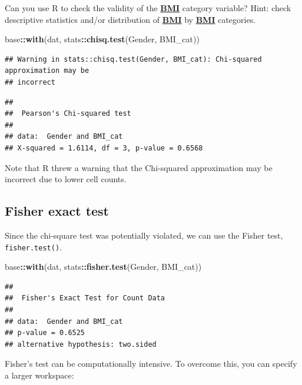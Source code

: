 \documentclass[
]{book}
\newenvironment{Shaded}{\begin{snugshade}}{\end{snugshade}}
\newcommand{\FunctionTok}[1]{\textcolor[rgb]{0.13,0.29,0.53}{\textbf{#1}}}
\newcommand{\NormalTok}[1]{#1}
\newcommand{\SpecialCharTok}[1]{\textcolor[rgb]{0.81,0.36,0.00}{\textbf{#1}}}
\begin{document}
Can you use R to check the validity of the \textbf{\hyperref[acronyms_BMI]{BMI}} category variable? Hint: check descriptive statistics and/or distribution of \textbf{\hyperref[acronyms_BMI]{BMI}} by \textbf{\hyperref[acronyms_BMI]{BMI}} categories.

\begin{Shaded}
\begin{Highlighting}[]
\NormalTok{base}\SpecialCharTok{::}\FunctionTok{with}\NormalTok{(dat, stats}\SpecialCharTok{::}\FunctionTok{chisq.test}\NormalTok{(Gender, BMI\_cat))}
\end{Highlighting}
\end{Shaded}

\begin{verbatim}
## Warning in stats::chisq.test(Gender, BMI_cat): Chi-squared approximation may be
## incorrect
\end{verbatim}

\begin{verbatim}
## 
##  Pearson's Chi-squared test
## 
## data:  Gender and BMI_cat
## X-squared = 1.6114, df = 3, p-value = 0.6568
\end{verbatim}

Note that R threw a warning that the Chi-squared approximation may be incorrect due to lower cell counts.

\subsection{Fisher exact test}\label{sec:fisherExact}

Since the chi-square test was potentially violated, we can use the Fisher test, \texttt{fisher.test()}.

\begin{Shaded}
\begin{Highlighting}[]
\NormalTok{base}\SpecialCharTok{::}\FunctionTok{with}\NormalTok{(dat, stats}\SpecialCharTok{::}\FunctionTok{fisher.test}\NormalTok{(Gender, BMI\_cat))}
\end{Highlighting}
\end{Shaded}

\begin{verbatim}
## 
##  Fisher's Exact Test for Count Data
## 
## data:  Gender and BMI_cat
## p-value = 0.6525
## alternative hypothesis: two.sided
\end{verbatim}

Fisher's test can be computationally intensive. To overcome this, you can specify a larger workspace:
\end{document}
